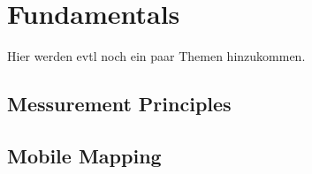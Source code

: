 \chapter{Fundamentals}
Hier werden evtl noch ein paar Themen hinzukommen.
\section{Messurement Principles}
\section{Mobile Mapping}

